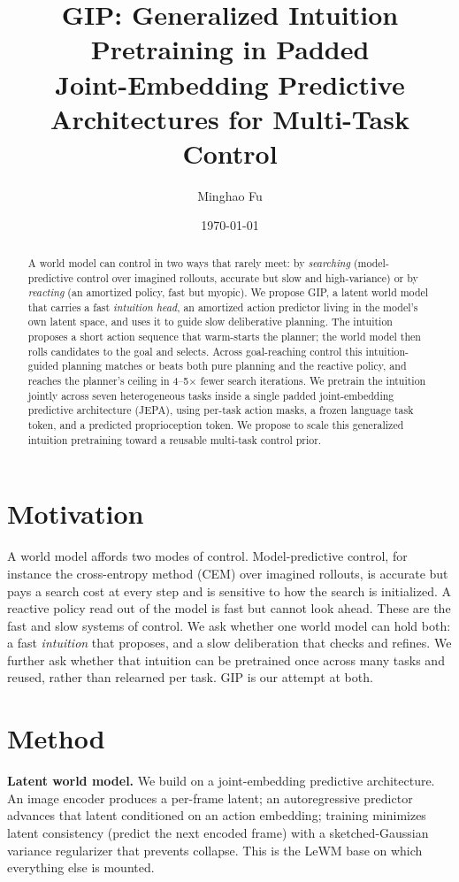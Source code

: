 \documentclass[11pt]{article}
\title{\vspace{-3em}\textbf{GIP: Generalized Intuition Pretraining in Padded\\
Joint-Embedding Predictive Architectures for Multi-Task Control}}
\author{Minghao Fu}
\date{\today}
\begin{document}
\maketitle
\vspace{-1.5em}

\begin{abstract}
\noindent
A world model can control in two ways that rarely meet: by \emph{searching} (model-predictive
control over imagined rollouts, accurate but slow and high-variance) or by \emph{reacting} (an
amortized policy, fast but myopic). We propose GIP, a latent world model that carries a fast
\emph{intuition head}, an amortized action predictor living in the model's own latent space, and
uses it to guide slow deliberative planning. The intuition proposes a short action sequence that
warm-starts the planner; the world model then rolls candidates to the goal and selects. Across
goal-reaching control this intuition-guided planning matches or beats both pure planning and the
reactive policy, and reaches the planner's ceiling in 4--5$\times$ fewer search iterations. We
pretrain the intuition jointly across seven heterogeneous tasks inside a single padded
joint-embedding predictive architecture (JEPA), using per-task action masks, a frozen language
task token, and a predicted proprioception token. We propose to scale this generalized intuition
pretraining toward a reusable multi-task control prior.
\end{abstract}

\section{Motivation}
A world model affords two modes of control. Model-predictive control, for instance the cross-entropy
method (CEM) over imagined rollouts, is accurate but pays a search cost at every step and is
sensitive to how the search is initialized. A reactive policy read out of the model is fast but
cannot look ahead. These are the fast and slow systems of control. We ask whether one world model
can hold both: a fast \emph{intuition} that proposes, and a slow deliberation that checks and
refines. We further ask whether that intuition can be pretrained once across many tasks and reused,
rather than relearned per task. GIP is our attempt at both.

\section{Method}
\textbf{Latent world model.} We build on a joint-embedding predictive architecture. An image encoder
produces a per-frame latent; an autoregressive predictor advances that latent conditioned on an
action embedding; training minimizes latent consistency (predict the next encoded frame) with a
sketched-Gaussian variance regularizer that prevents collapse. This is the LeWM base on which
everything else is mounted.
\end{document}
